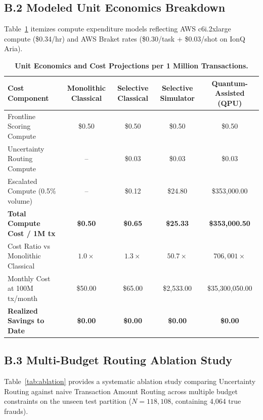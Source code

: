 \documentclass[10pt,a4paper]{article}
\begin{document}
\subsection*{B.2 Modeled Unit Economics Breakdown}
Table~\ref{tab:econ_bench} itemizes compute expenditure models reflecting AWS c6i.2xlarge compute (\$0.34/hr) and AWS Braket rates (\$0.30/task + \$0.03/shot on IonQ Aria).

\vspace{-2pt}
\begin{table}[h!]
\centering
\scriptsize
\renewcommand{\arraystretch}{0.76}
\caption{\textbf{Unit Economics and Cost Projections per 1 Million Transactions.}}
\label{tab:econ_bench}
\vspace{1pt}
\begin{tabularx}{\linewidth}{@{}lcccc@{}}
\toprule
\textbf{Cost Component} & \textbf{Monolithic Classical} & \textbf{Selective Classical} & \textbf{Selective Simulator} & \textbf{Quantum-Assisted (QPU)} \\
\midrule
Frontline Scoring Compute & \$0.50 & \$0.50 & \$0.50 & \$0.50 \\
Uncertainty Routing Compute & -- & \$0.03 & \$0.03 & \$0.03 \\
Escalated Compute (0.5\% volume) & -- & \$0.12 & \$24.80 & \$353,000.00 \\
\textbf{Total Compute Cost / 1M tx} & \textbf{\$0.50} & \textbf{\$0.65} & \textbf{\$25.33} & \textbf{\$353,000.50} \\
Cost Ratio vs Monolithic Classical & $1.0\times$ & $1.3\times$ & $50.7\times$ & $706,001\times$ \\
Monthly Cost at 100M tx/month & \$50.00 & \$65.00 & \$2,533.00 & \$35,300,050.00 \\
\midrule
\textbf{Realized Savings to Date} & \textbf{\$0.00} & \textbf{\$0.00} & \textbf{\$0.00} & \textbf{\$0.00} \\
\bottomrule
\end{tabularx}
\end{table}
\vspace{-5pt}

\subsection*{B.3 Multi-Budget Routing Ablation Study}
Table~\ref{tab:ablation} provides a systematic ablation study comparing Uncertainty Routing against naive Transaction Amount Routing across multiple budget constraints on the unseen test partition ($N=118,108$, containing 4,064 true frauds).
\end{document}
